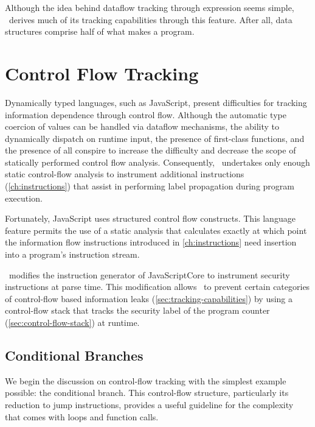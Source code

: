 Although the idea behind dataflow tracking through expression seems simple, \FlowCore\ derives much of its tracking capabilities through this feature.
After all, data structures comprise half of what makes a program\cite{wirth+76}.

\section{Control Flow Tracking}
\label{sec:control-flow-tracking}

Dynamically typed languages, such as JavaScript, present difficulties for tracking information dependence through control flow.
Although the automatic type coercion of values can be handled via dataflow mechanisms, the ability to dynamically dispatch on runtime input, the presence of first-class functions, and the presence of  all conspire to increase the difficulty and decrease the scope of statically performed control flow analysis.
Consequently, \FlowCore\ undertakes only enough static control-flow analysis to instrument additional instructions (\autoref{ch:instructions}) that assist in performing label propagation during program execution.

Fortunately, JavaScript uses structured control flow constructs.
This language feature permits the use of a static analysis that calculates exactly at which point the information flow instructions introduced in \autoref{ch:instructions} need insertion into a program's instruction stream.

\FlowCore\ modifies the instruction generator of JavaScriptCore to instrument security instructions at parse time.
This modification allows \FlowCore\ to prevent certain categories of control-flow based information leaks (\autoref{sec:tracking-capabilities}) by using a control-flow stack that tracks the security label of the program counter (\autoref{sec:control-flow-stack}) at runtime.


\subsection{Conditional Branches}
\label{sec:conditional-branch}

We begin the discussion on control-flow tracking with the simplest example possible: the conditional branch.
This control-flow structure, particularly its reduction to jump instructions, provides a useful guideline for the complexity that comes with loops and function calls.

